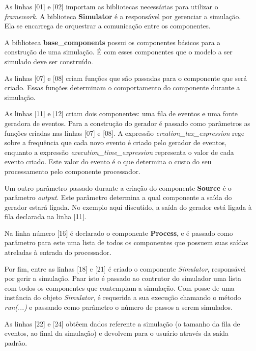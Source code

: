 As linhas [01] e [02] importam as bibliotecas necessárias para utilizar o \textit{framework}. A biblioteca \textbf{Simulator} é a responsável por gerenciar a simulação. Ela se encarrega de orquestrar a comunicação entre os componentes.

A biblioteca \textbf{base\_components} possui os componentes básicos para a construção de uma simulação. É com esses componentes que o modelo a ser simulado deve ser construído.


As linhas [07] e [08] criam funções que são passadas para o componente que será criado. Essas funções determinam o comportamento do componente durante a simulação. 

As linhas [11] e [12] criam dois componentes: uma fila de eventos e uma fonte geradora de eventos. Para a construção do gerador é passado como parâmetros as funções criadas nas linhas [07] e [08]. A expressão \textit{creation\_tax\_expression} rege sobre a frequência que cada novo evento é criado pelo gerador de eventos, enquanto a expressão \textit{execution\_time\_expression} representa o valor de cada evento criado. Este valor do evento é o que determina o custo do seu processamento pelo componente processador.

Um outro parâmetro passado durante a criação do componente \textbf{Source} é o parâmetro \textit{output}. Este parâmetro determina a qual componente a saída do gerador estará ligada. No exemplo aqui discutido, a saída do gerador está ligada à fila declarada na linha [11].

Na linha número [16] é declarado o componente \textbf{Process}, e é passado como parâmetro para este uma lista de todos os componentes que possuem suas saídas atreladas à entrada do processador.

Por fim, entre as linhas [18] e [21] é criado o componente \textit{Simulator}, responsável por gerir a simulação. Paar isto é passado ao contrutor do simulador uma lista com todos os componentes que contemplam a simulação. Com posse de uma instância do objeto \textit{Simulator}, é requerida a sua execução chamando o método \textit{run(...)}  e passando como parâmetro o número de passos a serem simulados.

As linhas [22] e [24] obtêem dados referente a simulação (o tamanho da fila de eventos, ao final da simulação) e devolvem para o usuário através da saída padrão.




